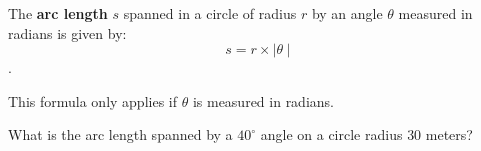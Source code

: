 \begin{definition}
  \label{def:arc_length}

  The \textbf{arc length} $s$ spanned in a circle of radius $r$ by an angle
  $\theta$ measured in radians is given by:
  \[ s = r \times \mid \theta \mid \].

  \begin{note}
    This formula only applies if $\theta$ is measured in radians.
  \end{note}
\end{definition}

\begin{exc}
  \label{exc:what_is_the_arc_length_spanned_by_a_40_degree_angle_on_a_circle_of_radius_30_meters}

  What is the arc length spanned by a $40^{\circ}$ angle on a circle radius $30$
  meters?
\end{exc}

\newpage

